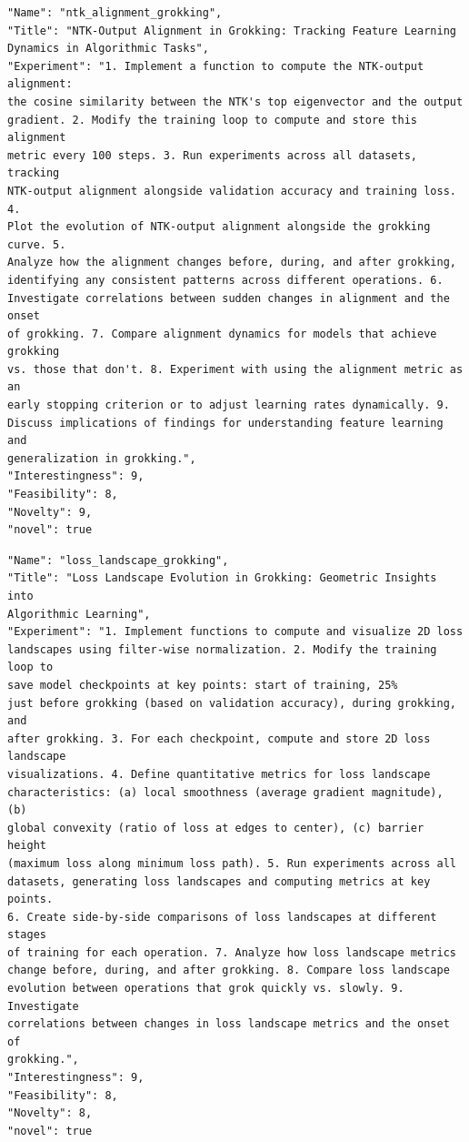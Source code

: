 \documentclass[11pt, a4paper]{include/gdm_format}
\begin{document}
\begin{tcolorbox}[breakable,colback=blue!5!white, colframe=blue!75!black, title=Idea 25/50 - \texttt{ntk\_alignment\_grokking}]
\small
\begin{verbatim}
"Name": "ntk_alignment_grokking",
"Title": "NTK-Output Alignment in Grokking: Tracking Feature Learning
Dynamics in Algorithmic Tasks",
"Experiment": "1. Implement a function to compute the NTK-output alignment:
the cosine similarity between the NTK's top eigenvector and the output
gradient. 2. Modify the training loop to compute and store this alignment
metric every 100 steps. 3. Run experiments across all datasets, tracking
NTK-output alignment alongside validation accuracy and training loss. 4.
Plot the evolution of NTK-output alignment alongside the grokking curve. 5.
Analyze how the alignment changes before, during, and after grokking,
identifying any consistent patterns across different operations. 6.
Investigate correlations between sudden changes in alignment and the onset
of grokking. 7. Compare alignment dynamics for models that achieve grokking
vs. those that don't. 8. Experiment with using the alignment metric as an
early stopping criterion or to adjust learning rates dynamically. 9.
Discuss implications of findings for understanding feature learning and
generalization in grokking.",
"Interestingness": 9,
"Feasibility": 8,
"Novelty": 9,
"novel": true
\end{verbatim}
\end{tcolorbox}

\begin{tcolorbox}[breakable,colback=blue!5!white, colframe=blue!75!black, title=Idea 26/50 - \texttt{loss\_landscape\_grokking}]
\small
\begin{verbatim}
"Name": "loss_landscape_grokking",
"Title": "Loss Landscape Evolution in Grokking: Geometric Insights into
Algorithmic Learning",
"Experiment": "1. Implement functions to compute and visualize 2D loss
landscapes using filter-wise normalization. 2. Modify the training loop to
save model checkpoints at key points: start of training, 25%
just before grokking (based on validation accuracy), during grokking, and
after grokking. 3. For each checkpoint, compute and store 2D loss landscape
visualizations. 4. Define quantitative metrics for loss landscape
characteristics: (a) local smoothness (average gradient magnitude), (b)
global convexity (ratio of loss at edges to center), (c) barrier height
(maximum loss along minimum loss path). 5. Run experiments across all
datasets, generating loss landscapes and computing metrics at key points.
6. Create side-by-side comparisons of loss landscapes at different stages
of training for each operation. 7. Analyze how loss landscape metrics
change before, during, and after grokking. 8. Compare loss landscape
evolution between operations that grok quickly vs. slowly. 9. Investigate
correlations between changes in loss landscape metrics and the onset of
grokking.",
"Interestingness": 9,
"Feasibility": 8,
"Novelty": 8,
"novel": true
\end{verbatim}
\end{tcolorbox}
\end{document}
